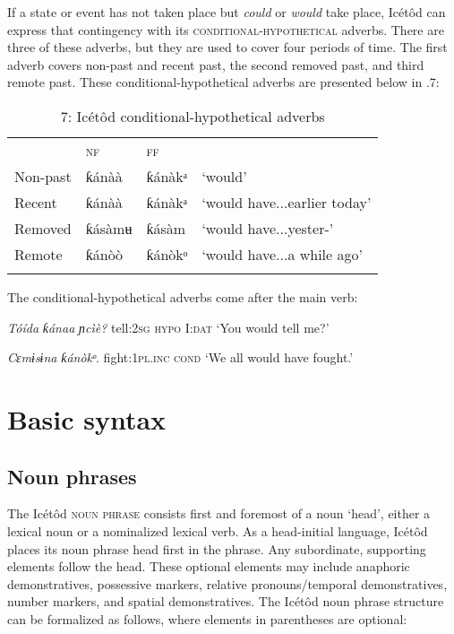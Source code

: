If a state or event has not taken place but \textit{could} or \textit{would} take place, Icétôd can express that contingency with its \textsc{conditional-hypothetical} adverbs. There are three of these adverbs, but they are used to cover four periods of time. The first adverb covers non-past and recent past, the second removed past, and third remote past. These conditional-hypothetical adverbs are presented below in .7:


\begin{table}
\caption{7: Icétôd conditional-hypothetical adverbs}
\label{tab:9}


\begin{tabularx}{\textwidth}{XXXX} & \textsc{nf} & \textsc{ff} & \\
\lsptoprule
Non-past & ƙánàà & ƙánàkᵃ & ‘would’\\
Recent & ƙánàà & ƙánàkᵃ & ‘would have...earlier today’\\
Removed & ƙásàmʉ & ƙásàm & ‘would have...yester-’\\
Remote & ƙánòò & ƙánòkᵒ & ‘would have...a while ago’\\
\lspbottomrule
\end{tabularx}
\end{table}
The conditional-hypothetical adverbs come after the main verb:




\textit{Tóída}     \textit{ƙánaa}\textit{   ɲcìè?}
tell:\textsc{2sg}   \textsc{hypo}     I:\textsc{dat}
‘You would tell me?’




\textit{Cɛmɨsɨna}   \textit{ƙánòkᵒ}.
fight:\textsc{1pl.inc cond}
‘We all would have fought.’




\section{Basic syntax}



\subsection{Noun phrases}


The Icétôd \textsc{noun phrase} consists first and foremost of a noun ‘head’, either a lexical noun or a nominalized lexical verb. As a head-initial language, Icétôd places its noun phrase head first in the phrase. Any subordinate, supporting elements follow the head. These optional elements may include anaphoric demonstratives, possessive markers, relative pronouns/temporal demonstratives, number markers, and spatial demonstratives. The Icétôd noun phrase structure can be formalized as follows, where elements in parentheses are optional:




